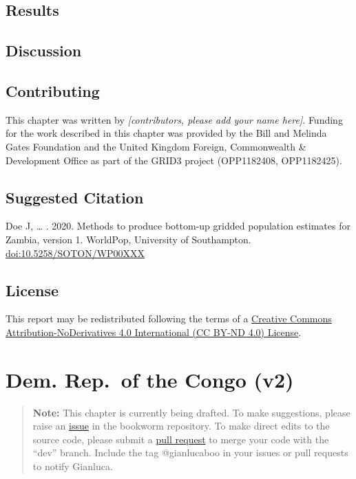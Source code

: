 \documentclass[]{book}
\begin{document}
\section{Results}\label{results-1}

\section{Discussion}\label{discussion-2}

\section*{Contributing}\label{contributing-7}

This chapter was written by \emph{{[}contributors, please add your name
here{]}}. Funding for the work described in this chapter was provided by
the Bill and Melinda Gates Foundation and the United Kingdom Foreign,
Commonwealth \& Development Office as part of the GRID3 project
(OPP1182408, OPP1182425).

\section*{Suggested Citation}\label{suggested-citation-7}

Doe J, \ldots{} . 2020. Methods to produce bottom-up gridded population
estimates for Zambia, version 1. WorldPop, University of Southampton.
\url{doi:10.5258/SOTON/WP00XXX}

\section*{License}\label{license-5}

This report may be redistributed following the terms of a
\href{https://creativecommons.org/licenses/by-nd/4.0/}{Creative Commons
Attribution-NoDerivatives 4.0 International (CC BY-ND 4.0) License}.

\chapter{Dem. Rep.~of the Congo (v2)}\label{dem.-rep.of-the-congo-v2}

\begin{quote}
\textbf{Note:} This chapter is currently being drafted. To make
suggestions, please raise an
\href{https://github.com/wpgp/bookworm/issues}{issue} in the bookworm
repository. To make direct edits to the source code, please submit a
\href{https://github.com/wpgp/bookworm/pulls}{pull request} to merge
your code with the ``dev'' branch. Include the tag @gianlucaboo in your
issues or pull requests to notify Gianluca.
\end{quote}
\end{document}
